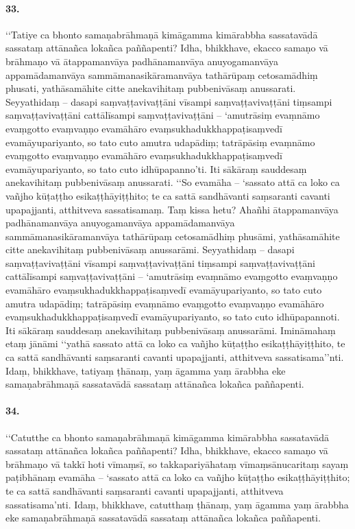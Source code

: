 \paragraph{33.}
‘‘Tatiye ca bhonto samaṇabrāhmaṇā kimāgamma kimārabbha sassatavādā sassataṃ attānañca lokañca paññapenti? Idha, bhikkhave, ekacco samaṇo vā brāhmaṇo vā ātappamanvāya padhānamanvāya anuyogamanvāya appamādamanvāya sammāmanasikāramanvāya tathārūpaṃ cetosamādhiṃ phusati, yathāsamāhite citte anekavihitaṃ pubbenivāsaṃ anussarati. Seyyathidaṃ – dasapi saṃvaṭṭavivaṭṭāni vīsampi saṃvaṭṭavivaṭṭāni tiṃsampi saṃvaṭṭavivaṭṭāni cattālīsampi saṃvaṭṭavivaṭṭāni – ‘amutrāsiṃ evaṃnāmo evaṃgotto evaṃvaṇṇo evamāhāro evaṃsukhadukkhappaṭisaṃvedī evamāyupariyanto, so tato cuto amutra udapādiṃ; tatrāpāsiṃ evaṃnāmo evaṃgotto evaṃvaṇṇo evamāhāro evaṃsukhadukkhappaṭisaṃvedī evamāyupariyanto, so tato cuto idhūpapanno’ti. Iti sākāraṃ sauddesaṃ anekavihitaṃ pubbenivāsaṃ anussarati. ‘‘So evamāha – ‘sassato attā ca loko ca vañjho kūṭaṭṭho esikaṭṭhāyiṭṭhito; te ca sattā sandhāvanti saṃsaranti cavanti upapajjanti, atthitveva sassatisamaṃ. Taṃ kissa hetu? Ahañhi ātappamanvāya padhānamanvāya anuyogamanvāya appamādamanvāya sammāmanasikāramanvāya tathārūpaṃ cetosamādhiṃ phusāmi, yathāsamāhite citte anekavihitaṃ pubbenivāsaṃ anussarāmi. Seyyathidaṃ – dasapi saṃvaṭṭavivaṭṭāni vīsampi saṃvaṭṭavivaṭṭāni tiṃsampi saṃvaṭṭavivaṭṭāni cattālīsampi saṃvaṭṭavivaṭṭāni – ‘amutrāsiṃ evaṃnāmo evaṃgotto evaṃvaṇṇo evamāhāro evaṃsukhadukkhappaṭisaṃvedī evamāyupariyanto, so tato cuto amutra udapādiṃ; tatrāpāsiṃ evaṃnāmo evaṃgotto evaṃvaṇṇo evamāhāro evaṃsukhadukkhappaṭisaṃvedī evamāyupariyanto, so tato cuto idhūpapannoti. Iti sākāraṃ sauddesaṃ anekavihitaṃ pubbenivāsaṃ anussarāmi. Imināmahaṃ etaṃ jānāmi ‘‘yathā sassato attā ca loko ca vañjho kūṭaṭṭho esikaṭṭhāyiṭṭhito, te ca sattā sandhāvanti saṃsaranti cavanti upapajjanti, atthitveva sassatisama’’nti. Idaṃ, bhikkhave, tatiyaṃ ṭhānaṃ, yaṃ āgamma yaṃ ārabbha eke samaṇabrāhmaṇā sassatavādā sassataṃ attānañca lokañca paññapenti.
\paragraph{34.}
‘‘Catutthe ca bhonto samaṇabrāhmaṇā kimāgamma kimārabbha sassatavādā sassataṃ attānañca lokañca paññapenti? Idha, bhikkhave, ekacco samaṇo vā brāhmaṇo vā takkī hoti vīmaṃsī, so takkapariyāhataṃ vīmaṃsānucaritaṃ sayaṃ paṭibhānaṃ evamāha – ‘sassato attā ca loko ca vañjho kūṭaṭṭho esikaṭṭhāyiṭṭhito; te ca sattā sandhāvanti saṃsaranti cavanti upapajjanti, atthitveva sassatisama’nti. Idaṃ, bhikkhave, catutthaṃ ṭhānaṃ, yaṃ āgamma yaṃ ārabbha eke samaṇabrāhmaṇā sassatavādā sassataṃ attānañca lokañca paññapenti.

